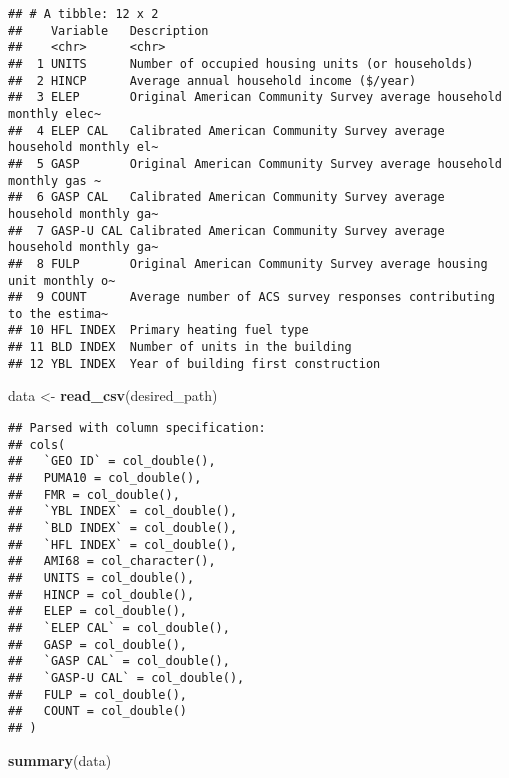 \documentclass[]{article}
\newenvironment{Shaded}{\begin{snugshade}}{\end{snugshade}}
\newcommand{\KeywordTok}[1]{\textcolor[rgb]{0.13,0.29,0.53}{\textbf{#1}}}
\newcommand{\NormalTok}[1]{#1}
\newcommand{\StringTok}[1]{\textcolor[rgb]{0.31,0.60,0.02}{#1}}
\begin{document}
\begin{verbatim}
## # A tibble: 12 x 2
##    Variable   Description                                                       
##    <chr>      <chr>                                                             
##  1 UNITS      Number of occupied housing units (or households)                  
##  2 HINCP      Average annual household income ($/year)                          
##  3 ELEP       Original American Community Survey average household monthly elec~
##  4 ELEP CAL   Calibrated American Community Survey average household monthly el~
##  5 GASP       Original American Community Survey average household monthly gas ~
##  6 GASP CAL   Calibrated American Community Survey average household monthly ga~
##  7 GASP-U CAL Calibrated American Community Survey average household monthly ga~
##  8 FULP       Original American Community Survey average housing unit monthly o~
##  9 COUNT      Average number of ACS survey responses contributing to the estima~
## 10 HFL INDEX  Primary heating fuel type                                         
## 11 BLD INDEX  Number of units in the building                                   
## 12 YBL INDEX  Year of building first construction
\end{verbatim}

\begin{Shaded}
\begin{Highlighting}[]
\NormalTok{data <-}\StringTok{ }\KeywordTok{read_csv}\NormalTok{(desired_path)}
\end{Highlighting}
\end{Shaded}

\begin{verbatim}
## Parsed with column specification:
## cols(
##   `GEO ID` = col_double(),
##   PUMA10 = col_double(),
##   FMR = col_double(),
##   `YBL INDEX` = col_double(),
##   `BLD INDEX` = col_double(),
##   `HFL INDEX` = col_double(),
##   AMI68 = col_character(),
##   UNITS = col_double(),
##   HINCP = col_double(),
##   ELEP = col_double(),
##   `ELEP CAL` = col_double(),
##   GASP = col_double(),
##   `GASP CAL` = col_double(),
##   `GASP-U CAL` = col_double(),
##   FULP = col_double(),
##   COUNT = col_double()
## )
\end{verbatim}

\begin{Shaded}
\begin{Highlighting}[]
\KeywordTok{summary}\NormalTok{(data)}
\end{Highlighting}
\end{Shaded}
\end{document}
